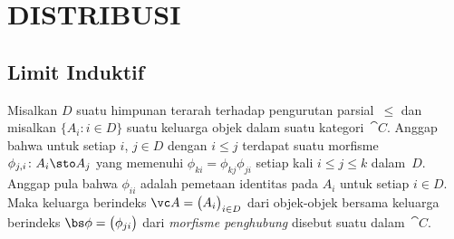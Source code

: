 \chapter{DISTRIBUSI}

\section{Limit Induktif}\label{sec_ind_limits}
\begin{defn}\label{defn_dir_sys} Misalkan $D$ suatu himpunan terarah terhadap pengurutan parsial~$\le$ dan misalkan $\{A_i\colon i \in D\}$ suatu keluarga
objek dalam suatu kategori~$\cat C$.  Anggap bahwa untuk setiap $i$, $j \in D$ dengan $i \le j$ terdapat suatu morfisme
$\phi_{j,i}\colon A_i \sto A_j$ yang memenuhi $\phi_{ki} = \phi_{kj}\phi_{ji}$ setiap kali $i \le j \le k$ dalam~$D$.  Anggap pula bahwa
$\phi_{ii}$ adalah pemetaan identitas pada $A_i$ untuk setiap $i \in D$. Maka keluarga berindeks $\vc A = \bigl(A_i\bigr)_{i \in D}$ dari
objek-objek bersama keluarga berindeks $\bs\phi = \bigl(\phi_{ji}\bigr)$ dari \emph{morfisme penghubung} disebut suatu
 dalam~$\cat C$.
\end{defn}

